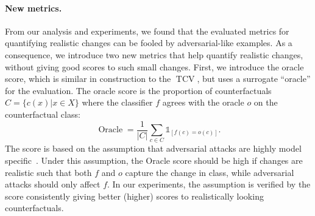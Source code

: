 \documentclass[11pt,a4paper,twoside,openright,final]{memoir}
\begin{document}
\paragraph{New metrics.}
From our analysis and experiments, we found that the evaluated metrics for quantifying realistic changes can be fooled by adversarial-like examples.
As a consequence, we introduce two new metrics that help quantify realistic changes, without giving good scores to such small changes.
First, we introduce the oracle score, which is similar in construction to the $\operatorname{TCV}$, but uses a surrogate ``oracle'' for the evaluation.
The oracle score is the proportion of counterfactuals $C = \{c(x)  | x \in X\}$ where the classifier $f$ agrees with the oracle $o$ on the counterfactual class: 
\begin{equation}\label{eq:oracle}
    \operatorname{Oracle} = \frac{1}{|C|}\sum_{c\in C} \mathbb{1}_{[ f(c) = o(c) ]}.
\end{equation}
The score is based on the assumption that adversarial attacks are highly model specific~\cite{Liu2017}.
Under this assumption, the Oracle score should be high if changes are realistic such that both $f$ and $o$ capture the change in class, while adversarial attacks should only affect $f$.
In our experiments, the assumption is verified by the score consistently giving better (higher) scores to realistically looking counterfactuals.
\end{document}
